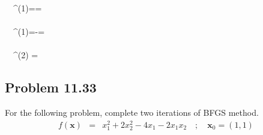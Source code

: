 \documentclass[]{report}
\begin{document}
\begin{program}
\quad \quad \ \ ^{(1)}==\left[\begin{array}{cc}-0.0092&0.0849\\0.0849&-0.7836\end{array}\right]\\~  \\
\quad \quad \ \ ^{(1)}=-=\left[\begin{array}{cc}0.5888&-0.4210\\-0.4210 & 0.3010\end{array}\right]\\~  \\
\quad \quad \ \  ^{(2)} =\left[\begin{array}{cc}    1.4696 &   0.0439\\-0.7161& -0.0726\end{array}\right]
\end{program}
\subsection*{Problem 11.33}
For the following problem, complete two iterations of BFGS method.
\begin{eqnarray*}
f\left(\mathbf x\right)&=&x_1^2+2x_2^2-4x_1-2x_1x_2 \quad ; \quad \mathbf{x}_0=\left(1,1\right)
\end{eqnarray*}
\end{document}
